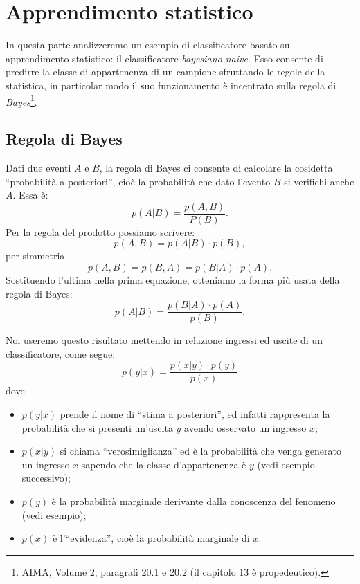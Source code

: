 \section{Apprendimento statistico}
In questa parte analizzeremo un esempio di classificatore basato su apprendimento statistico: il classificatore \emph{bayesiano naive}. Esso  consente di predirre la classe di appartenenza di un campione sfruttando le regole della statistica, in particolar modo il suo funzionamento è incentrato sulla regola di \emph{Bayes}\footnote{AIMA, Volume 2, paragrafi 20.1 e 20.2 (il capitolo 13 è propedeutico).}.

\subsection{Regola di Bayes}
Dati due eventi $A$ e $B$, la regola di Bayes ci consente di calcolare la cosidetta ``probabilità a posteriori'', cioè la probabilità che dato l'evento $B$ si verifichi anche $A$. Essa è:
\begin{equation*}
p(A|B) = \frac{p(A,B)}{P(B)}.
\end{equation*}
Per la regola del prodotto possiamo scrivere:
\begin{equation*}
p(A,B) = p(A|B) \cdot p(B),
\end{equation*}
per simmetria
\begin{equation*}
p(A,B) = p(B,A) = p(B|A) \cdot p(A).
\end{equation*}
Sostituendo l'ultima nella prima equazione, otteniamo la forma più usata della regola di Bayes:
\begin{equation*}
p(A|B) = \frac{p(B|A) \cdot p(A)}{p(B)}.
\end{equation*}

Noi useremo questo risultato mettendo in relazione ingressi ed uscite di un classificatore, come segue:
\begin{equation*}
p(y|x) = \frac{p(x|y) \cdot p(y)}{p(x)}
\end{equation*}
dove:
\begin{itemize}
\item $p(y|x)$ prende il nome di ``stima a posteriori'', ed infatti rappresenta la probabilità che si presenti un'uscita $y$ avendo osservato un ingresso $x$;
\item $p(x|y)$ si chiama ``verosimiglianza'' ed è la probabilità che venga generato un ingresso $x$ sapendo che la classe d'appartenenza è $y$ (vedi esempio successivo);
\item $p(y)$ è la probabilità marginale derivante dalla conoscenza del fenomeno (vedi esempio);
\item $p(x)$ è l'``evidenza'', cioè la probabilità marginale di $x$.
\end{itemize}

